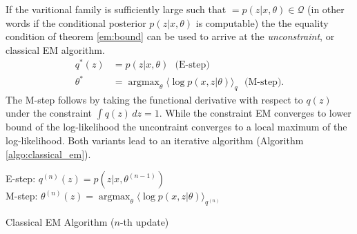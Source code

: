 If the varitional family is sufficiently large such that $=p(z|x,\theta) \in \mathcal Q$ (in other words if the conditional posterior $p(z|x,\theta)$ is computable) the the equality condition of theorem  \ref{em:bound} can be used to arrive at the \textit{unconstraint}, or classical EM algorithm. \cite{Dempster77maximumlikelihood, Neal:1999:VEA:308574.308679} 
\begin{align}
q^*(z) & =  p(z |x, \theta)  \text{~ (E-step)}\\
\theta^* &= 	\operatorname{argmax}_\theta \langle \log p(x, z | \theta) \rangle_{q}   \text{~ (M-step)}. 
\end{align} 
The M-step follows by taking the functional derivative with respect to $q(z)$ under the constraint $\int q(z)\, dz = 1$. While the constraint EM converges to lower bound of the log-likelihood the uncontraint converges to a local maximum of the log-likelihood. Both variants lead to an iterative algorithm (Algorithm \ref{algo:classical_em}).

 \begin{algorithm}[t] \label{algo:classical_em}
    E-step: $q^{(n)}(z) = p(z|x,\theta^{(n-1)})$ \\
    M-step: $\theta^{(n)}(z) = \operatorname{argmax}_\theta \langle \log p(x, z | \theta) \rangle_{q^{(n)}} $
	\caption{Classical EM Algorithm ($n$-th update)}
\end{algorithm} 

